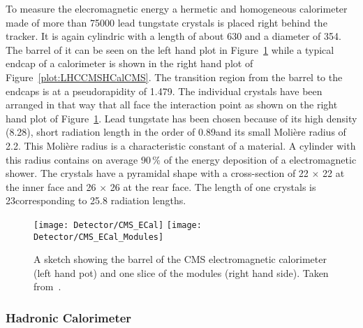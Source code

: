 To measure the elecromagnetic energy a hermetic and homogeneous calorimeter made of more than 75000 lead tungstate crystals is placed right behind the tracker. It is again cylindric with a length of about 630\cm{} and a diameter of 354\cm. The barrel of it can be seen on the left hand plot in Figure~\ref{plot:LHCCMSECalCMS} while a typical endcap of a calorimeter is shown in the right hand plot of Figure~\ref{plot:LHCCMSHCalCMS}. The transition region from the barrel to the endcaps is at a pseudorapidity of 1.479. The individual crystals have been arranged in that way that all face the interaction point as shown on the right hand plot of Figure~\ref{plot:LHCCMSECalCMS}. Lead tungstate has been chosen because of its high density (8.28\gcmc{}), short radiation length in the order of 0.89\cm and its small Moli\`ere radius of 2.2\cm{}. This Moli\`ere radius is a characteristic constant of a material. A cylinder with this radius contains on average $90\,\%$ of the energy deposition of a electromagnetic shower. The crystals have a pyramidal shape with a cross-section of 22 $\times{}$ 22\mms{} at the inner face and 26 $\times{}$ 26\mms{} at the rear face. The length of one crystals is 23\cm corresponding to 25.8 radiation lengths.

\begin{figure}[!Hhtb]
  \centering
  \texttt{[image: Detector/CMS\_ECal]}
  \texttt{[image: Detector/CMS\_ECal\_Modules]}
  \caption[Sketches of the electromagnetic calorimeter of CMS]{A sketch showing the barrel of the CMS electromagnetic calorimeter (left hand pot) and one slice of the modules (right hand side). Taken from~. \label{plot:LHCCMSECalCMS}}
\end{figure}

\subsubsection{Hadronic Calorimeter}

